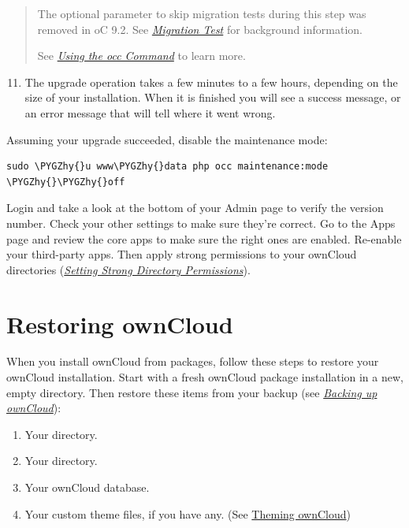 \documentclass[letterpaper,10pt,english]{sphinxmanual}
\def\PYGZhy{\char`\-}
\begin{document}
\begin{quote}

The optional parameter to skip migration tests during this step was removed in oC 9.2.
See {\hyperref[maintenance/upgrade:migration\string-test\string-label]{\emph{Migration Test}}} for background information.

See {\hyperref[configuration_server/occ_command::doc]{\emph{\emph{Using the occ Command}}}} to learn more.
\end{quote}
\begin{enumerate}
\setcounter{enumi}{10}
\item {} 
The upgrade operation takes a few minutes to a few hours, depending on the
size of your installation. When it is finished you will see a success
message, or an error message that will tell where it went wrong.

\end{enumerate}

Assuming your upgrade succeeded, disable the maintenance mode:

\begin{Verbatim}[commandchars=\\\{\}]
sudo \PYGZhy{}u www\PYGZhy{}data php occ maintenance:mode \PYGZhy{}\PYGZhy{}off
\end{Verbatim}

Login and take a look at the bottom of your Admin page to
verify the version number. Check your other settings to make sure they're
correct. Go to the Apps page and review the core apps to make sure the right
ones are enabled. Re-enable your third-party apps. Then apply strong
permissions to your ownCloud directories ({\hyperref[installation/installation_wizard:strong\string-perms\string-label]{\emph{Setting Strong Directory Permissions}}}).


\section{Restoring ownCloud}
\label{maintenance/restore::doc}\label{maintenance/restore:owncloud-org-install}\label{maintenance/restore:restoring-owncloud}
When you install ownCloud from packages, follow these steps to restore your ownCloud installation. Start with a fresh ownCloud package installation in a new, empty directory. Then restore these items from your backup (see {\hyperref[maintenance/backup::doc]{\emph{\emph{Backing up ownCloud}}}}):
\begin{enumerate}
\item {} 
Your  directory.

\item {} 
Your  directory.

\item {} 
Your ownCloud database.

\item {} 
Your custom theme files, if you have any. (See \href{https://doc.owncloud.org/server/9.2/developer\_manual/core/theming.html}{Theming ownCloud})

\end{enumerate}
\end{document}
